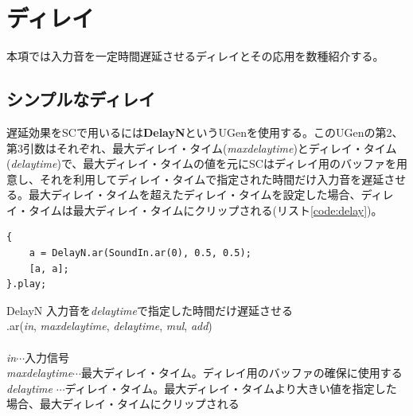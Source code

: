 \documentclass{jsarticle}
\begin{document}
\section{ディレイ}
本項では入力音を一定時間遅延させるディレイとその応用を数種紹介する。

\subsection{シンプルなディレイ}

遅延効果をSCで用いるには{\bf DelayN}というUGenを使用する。このUGenの第2、第3引数はそれぞれ、最大ディレイ・タイム({\it maxdelaytime})とディレイ・タイム({\it delaytime})で、最大ディレイ・タイムの値を元にSCはディレイ用のバッファを用意し、それを利用してディレイ・タイムで指定された時間だけ入力音を遅延させる。最大ディレイ・タイムを超えたディレイ・タイムを設定した場合、ディレイ・タイムは最大ディレイ・タイムにクリップされる(リスト\ref{code:delay})。
\begin{lstlisting}[caption=ディレイ, label=code:delay]
{
	a = DelayN.ar(SoundIn.ar(0), 0.5, 0.5);
	[a, a];
}.play;
\end{lstlisting}

\begin{itembox}[l]{DelayN}
	{\footnotesize 
	入力音を{\it delaytime}で指定した時間だけ遅延させる\\
	.ar({\it in}, {\it maxdelaytime}, {\it delaytime}, {\it mul}, {\it add})\\\\
	{\it in}$\cdots$入力信号\\
	{\it maxdelaytime}$\cdots$最大ディレイ・タイム。ディレイ用のバッファの確保に使用する\\
	{\it delaytime} $\cdots$ディレイ・タイム。最大ディレイ・タイムより大きい値を指定した場合、最大ディレイ・タイムにクリップされる
	}
\end{itembox}
\end{document}
